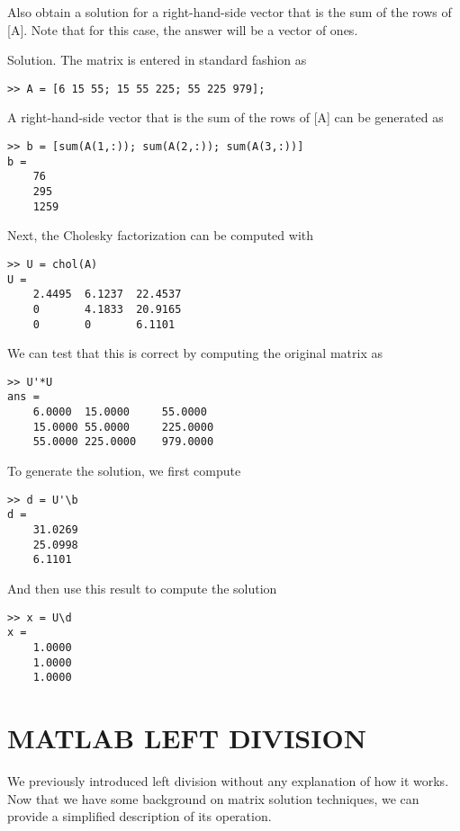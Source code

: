 \documentclass[../main.tex]{subfiles}
\begin{document}
Also obtain a solution for a right-hand-side vector that is the sum of the rows of [A]. Note that for this case, the answer will be a vector of ones.

Solution. The matrix is entered in standard fashion as

\begin{lstlisting}[numbers=none]
>> A = [6 15 55; 15 55 225; 55 225 979];
\end{lstlisting}

A right-hand-side vector that is the sum of the rows of [A] can be generated as

\begin{lstlisting}[numbers=none]
>> b = [sum(A(1,:)); sum(A(2,:)); sum(A(3,:))]
b =
	76
	295
	1259
\end{lstlisting}

Next, the Cholesky factorization can be computed with

\begin{lstlisting}[numbers=none]
>> U = chol(A)
U =
	2.4495 	6.1237 	22.4537
	0 		4.1833 	20.9165
	0 		0 		6.1101
\end{lstlisting}

We can test that this is correct by computing the original matrix as

\begin{lstlisting}[numbers=none]
>> U'*U
ans =
	6.0000 	15.0000 	55.0000
	15.0000	55.0000 	225.0000
	55.0000	225.0000 	979.0000
\end{lstlisting}

To generate the solution, we first compute

\begin{lstlisting}[numbers=none]
>> d = U'\b
d =
	31.0269
	25.0998
	6.1101
\end{lstlisting}

And then use this result to compute the solution

\begin{lstlisting}[numbers=none]
>> x = U\d
x =
	1.0000
	1.0000
	1.0000
\end{lstlisting}

\section{MATLAB LEFT DIVISION}

We previously introduced left division without any explanation of how it works. Now that
we have some background on matrix solution techniques, we can provide a simplified
description of its operation.
\end{document}
